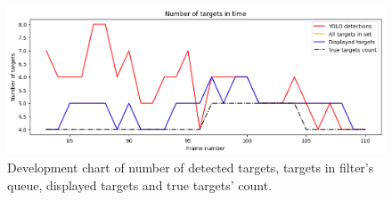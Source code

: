 \begin{figure}[H]
    \centering
    \includegraphics[width=\linewidth]{../../../experiments/E1/V2/SAM/sam_det}
    \caption{Development chart of number of detected targets, targets in filter's queue, displayed targets and true targets' count.}
    \label{gr:E1-V2-S2}
\end{figure}

